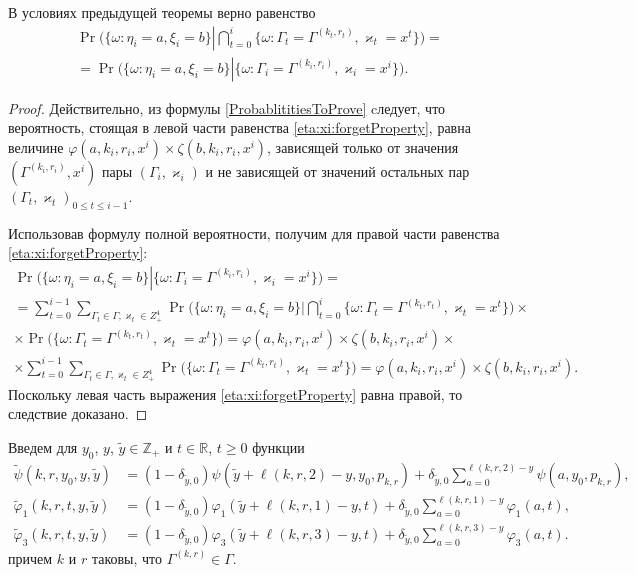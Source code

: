\documentclass[a4paper,12pt,russian]{extarticle}
\newcommand{\ml}[1]{\begin{multline}#1\end{multline}}
\begin{document}
\begin{corollary}\label{eta:xi:forget}
В условиях предыдущей теоремы верно равенство
\ml
{
\Pr \biggl(\{ \omega \colon \eta_i = a, \xi_i=b\} \left|\bigcap_{t=0}^{i}\{\omega\colon \Gamma_t=\Gamma^{(k_t,r_t)}, \varkappa_t=x^t\}\right.\biggr)=\\
=\Pr \biggl(\{ \omega \colon \eta_i = a, \xi_i=b\} \left|\{\omega\colon \Gamma_i=\Gamma^{(k_i,r_i)}, \varkappa_i=x^i\}\right.\biggr).
\label{eta:xi:forgetProperty}
}
\end{corollary}
\begin{proof}
Действительно, из формулы \eqref{ProbablititiesToProve} cледует, что вероятность, стоящая в левой части равенства \eqref{eta:xi:forgetProperty}, равна величине $\varphi(a,k_i,r_i,x^i)\times \zeta(b,k_i,r_i,x^i)$, зависящей только от значения $(\Gamma^{(k_i,r_i)},x^i)$ пары $(\Gamma_i,\varkappa_i)$ и не зависящей от значений остальных пар $(\Gamma_t,\varkappa_t)_{0\leqslant t \leqslant i-1}$. 

Использовав формулу полной вероятности, получим для правой части равенства \eqref{eta:xi:forgetProperty}:
\begin{multline*}
 \Pr \biggl(\{ \omega \colon \eta_i = a, \xi_i=b\} \left|\{\omega\colon \Gamma_i=\Gamma^{(k_i,r_i)}, \varkappa_i=x^i\}\right.\biggr) = \\ = \sum_{t=0}^{i-1}\sum_{\Gamma_t\in \Gamma, \varkappa_t \in Z^4_+}\Pr \biggl(\{ \omega \colon \eta_i = a, \xi_i=b\} \biggl|\bigcap_{t=0}^{i}\{\omega\colon \Gamma_t=\Gamma^{(k_t,r_t)}, \varkappa_t=x^t\}\biggr) \times \\ \times \Pr \biggl(\{ \omega \colon  \Gamma_t=\Gamma^{(k_t,r_t)}, \varkappa_t=x^t\}\biggr) = 
 \varphi(a,k_i,r_i,x^i)\times \zeta(b,k_i,r_i,x^i) \times \\ \times \sum_{t=0}^{i-1}\sum_{\Gamma_t\in \Gamma, \varkappa_t \in Z^4_+}\Pr \biggl(\{ \omega \colon  \Gamma_t=\Gamma^{(k_t,r_t)}, \varkappa_t=x^t\}\biggr) =\varphi(a,k_i,r_i,x^i)\times \zeta(b,k_i,r_i,x^i).
\end{multline*}
Поскольку левая часть выражения \eqref{eta:xi:forgetProperty} равна правой, то следствие доказано. 
\end{proof}

Введем для $y_0$, $y$, $\tilde{y} \in \mathbb{Z}_+$ и $t \in \mathbb{R}$, $t\geqslant 0$ функции
\begin{equation}
\begin{aligned}
\widetilde{\psi}(k,r,y_0,y,\tilde{y}) &= 
(1 - \delta_{\tilde{y},0}) \psi(\tilde{y}+\ell(k,r,2)-y,y_0, p_{k,r}) + \delta_{\tilde{y},0}\sum_{a=0}^{\ell(k,r,2)-y} \psi(a,y_0, p_{k,r}),\\
\widetilde{\varphi}_1(k,r,t,y,\tilde{y}) &= (1-\delta_{\tilde{y},0}) \varphi_1(\tilde{y} + \ell(k,r,1)-y,t)  +\delta_{\tilde{y},0}\sum_{a=0}^{\ell(k,r,1)-y} \varphi_1(a,t),\\
\widetilde{\varphi}_3(k,r,t,y,\tilde{y}) &= (1-\delta_{\tilde{y},0}) \varphi_3(\tilde{y} + \ell(k,r,3)-y,t)  +\delta_{\tilde{y},0}\sum_{a=0}^{\ell(k,r,3)-y} \varphi_3(a,t).
\end{aligned}
\label{tildephi}
\end{equation}
причем $k$ и $r$ таковы, что $\Gamma^{(k,r)}\in \Gamma$.
	
\end{document}
